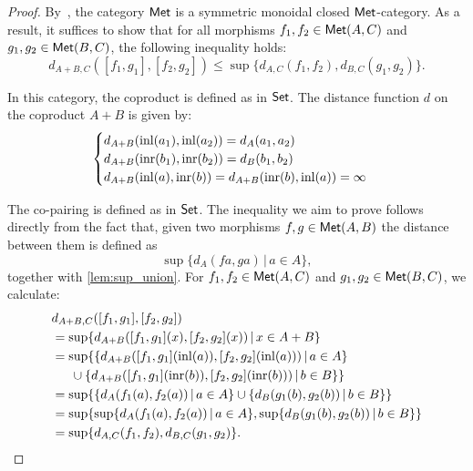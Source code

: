 \begin{proof}
  By~\cite[Example 3.8]{dahlqvist2023syntactic}, the category $\mathsf{Met}$ is a symmetric monoidal closed $\mathsf{Met}$-category. As a result, it suffices to show that for all morphisms \( f_1, f_2 \in \mathsf{Met}(A, C) \) and \( g_1, g_2 \in \mathsf{Met}(B, C) \), the following inequality holds:
\[
  d_{A + B, C}([f_1, g_1], [f_2, g_2]) \leq \sup \{d_{A,C}(f_1, f_2), d_{B,C}(g_1, g_2)\}.
\]

In this category, the coproduct is defined as in $\mathsf{Set}$. The distance function $d$ on the coproduct $A + B$ is given by:
   \[
    \begin{cases}
    d_{A + B}(\mathrm{inl}(a_1),\mathrm{inl}(a_2)) = d_A(a_1,a_2) \\
    d_{A + B}(\mathrm{inr}(b_1),\mathrm{inr}(b_2)) = d_B(b_1,b_2) \\
    d_{A + B}(\mathrm{inl}(a), \mathrm{inr}(b)) = 
    d_{A + B}(\mathrm{inr}(b), \mathrm{inl}(a))  = \infty
    \end{cases}
    \]

    The co-pairing is defined as in $\mathsf{Set}$. The inequality we aim to prove follows directly from the fact that, given two morphisms  $f,g\in \mathsf{Met}(A, B)$ the distance between them is defined as 
  \[ \sup \{ d_A (f a, g a) \,\vert \, a \in A \} ,\] 
    together with \autoref{lem:sup_union}. For  \( f_1, f_2 \in \mathsf{Met}(A, C) \) and \( g_1, g_2 \in \mathsf{Met}(B, C) \), we calculate:
    \begin{align*}
      & d_{A + B, C}([f_1, g_1], [f_2, g_2]) \\
      &  =  \sup \{ d_{A+ B} ([f_1, g_1] (x), [f_2, g_2] (x)) \,\vert \, x \in A + B \} \\
      & =  \sup \{ \{ d_{A+ B} ([f_1, g_1] (\mathrm{inl}(a)), [f_2, g_2] (\mathrm{inl}(a))) \,\vert \, a \in A \}    \\
      & \hspace{15pt} \cup \{d_{A+ B} ([f_1, g_1] (\mathrm{inr}(b)), [f_2, g_2] (\mathrm{inr}(b))) \,\vert \, b \in B\}\} \\
      & = \sup \{ \{ d_{A}(f_1 (a), f_2 (a)) \,\vert \, a \in A \} \cup  \{d_{B}(g_1 (b), g_2 (b)) \,\vert \, b \in B \}\} \\
      & = \sup   \{ \sup \{ d_{A}(f_1 (a), f_2 (a)) \,\vert \, a \in A \}, \sup\{d_{B}(g_1 (b), g_2 (b)) \,\vert \, b \in B \}\} \\
      &=  \sup \{d_{A,C}(f_1, f_2), d_{B,C}(g_1, g_2)\}. 
    \end{align*}
\end{proof}


